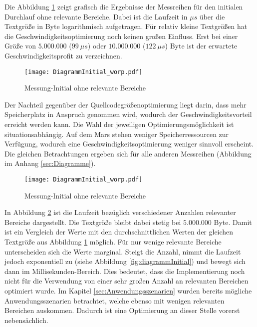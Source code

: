 Die Abbildung \ref{fig:diagrammInitial_worp} zeigt grafisch die Ergebnisse der
Messreihen für den initialen Durchlauf ohne relevante Bereiche. Dabei ist die
Laufzeit in $\mu s$ über die Textgröße in Byte logarithmisch aufgetragen. Für
relativ kleine Textgrößen hat die Geschwindigkeitsoptimierung noch keinen großen
Einfluss. Erst bei einer Größe von $5.000.000$ ($99\ \mu s$) oder
$10.000.000$ ($122\ \mu s$) Byte ist der erwartete Geschwindigkeitsprofit zu
verzeichnen.

\begin{figure}[H]
	\centering
	\texttt{[image: DiagrammInitial\_worp.pdf]}
	\label{fig:diagrammInitial_worp}
	\caption{Messung-Initial ohne relevante Bereiche}
\end{figure}

Der Nachteil gegenüber der Quellcodegrößenoptimierung liegt darin, dass
mehr Speicherplatz in Anspruch genommen wird, wodurch der
Geschwindigkeitsvorteil erreicht werden kann.
Die Wahl der jeweiligen Optimierungsmöglichkeit ist situationsabhängig. Auf dem
Mars stehen weniger Speicherressourcen zur Verfügung, wodurch eine
Geschwindigkeitsoptimierung weniger sinnvoll erscheint. Die gleichen
Betrachtungen ergeben sich für alle anderen Messreihen (Abbildung im Anhang
\ref{sec:Diagramme}). 

\begin{figure}[H]
	\centering
	\texttt{[image: DiagrammInitial\_worp.pdf]}
	\label{fig:diagrammInitial_wrp}
	\caption{Messung-Initial ohne relevante Bereiche}
\end{figure}

In Abbildung \ref{fig:diagrammInitial_wrp} ist die Laufzeit bezüglich
verschiedener Anzahlen relevanter Bereiche dargestellt. Die Textgröße bleibt
dabei stetig bei $5.000.000$ Byte. Damit ist ein Vergleich der Werte mit den
durchschnittlichen Werten der gleichen Textgröße aus Abbildung
\ref{fig:diagrammInitial_worp} möglich. Für nur wenige relevante Bereiche
unterscheiden sich die Werte marginal. Steigt die Anzahl, nimmt die Laufzeit
jedoch exponentiell zu (siehe Abbildung \ref{fig:diagrammInitial}) und bewegt
sich dann im Millisekunden-Bereich. Dies bedeutet, dass die Implementierung noch
nicht für die Verwendung von einer sehr großen Anzahl an relevanten Bereichen
optimiert wurde. Im Kapitel \ref{sec:Anwendungsszenarien} wurden bereits
mögliche Anwendungsszenarien betrachtet, welche ebenso mit wenigen relevanten
Bereichen auskommen. Dadurch ist eine Optimierung an dieser Stelle vorerst
nebensächlich.

